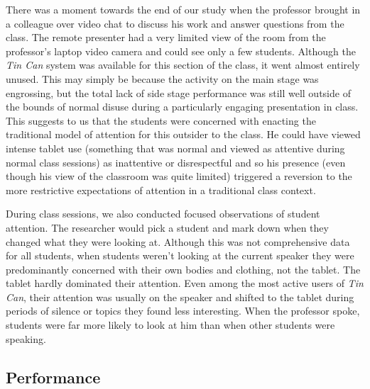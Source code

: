 
There was a moment towards the end of our study when the professor brought in a colleague over video chat to discuss his work and answer questions from the class. The remote presenter had a very limited view of the room from the professor's laptop video camera and could see only a few students. Although the \emph{Tin Can} system was available for this section of the class, it went almost entirely unused. This may simply be because the activity on the main stage was engrossing, but the total lack of side stage performance was still well outside of the bounds of normal disuse during a particularly engaging presentation in class. This suggests to us that the students were concerned with enacting the traditional model of attention for this outsider to the class. He could have viewed intense tablet use (something that was normal and viewed as attentive during normal class sessions) as inattentive or disrespectful and so his presence (even though his view of the classroom was quite limited) triggered a reversion to the more restrictive expectations of attention in a traditional class context.

During class sessions, we also conducted focused observations of student attention. The researcher would pick a student and mark down when they changed what they were looking at. Although this was not comprehensive data for all students, when students weren't looking at the current speaker they were predominantly concerned with their own bodies and clothing, not the tablet. The tablet hardly dominated their attention. Even among the most active users of \emph{Tin Can}, their attention was usually on the speaker and shifted to the tablet during periods of silence or topics they found less interesting. When the professor spoke, students were far more likely to look at him than when other students were speaking. 

\subsection{Performance}

